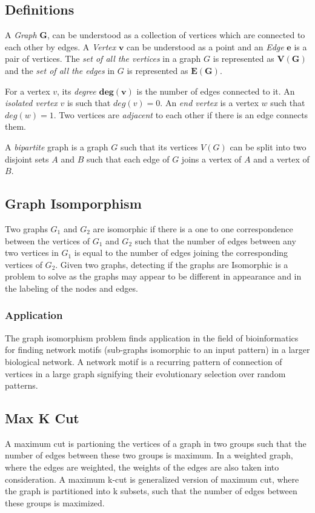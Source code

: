 \subsection{Definitions}
\label{graphtheory: definitions}
A \emph{Graph} $\boldsymbol{G}$, can be understood as a collection of vertices which are
connected to each other by edges.  A \emph{Vertex} $\boldsymbol{v}$ can be understood as a
point and an \emph{Edge} $\boldsymbol{e}$ is a pair of vertices.  The \emph{set of all the vertices}
in a graph $G$ is represented as $\boldsymbol{V(G)}$ and the \emph{set of all the
edges} in $G$ is represented as $\boldsymbol{E(G)}$.

For a vertex $v$, its \emph{degree} $\boldsymbol{deg(v)}$ is the number of edges
connected to it.  An \emph{isolated vertex} $v$ is such that $deg(v) = 0$. An
\emph{end vertex} is a vertex $w$ such that $deg(w) = 1$.  Two vertices are
\emph{adjacent} to each other if there is an edge connects them.

A \emph{bipartite} graph is a graph $G$ such that its vertices $V(G)$ can
be split into two disjoint sets $A$ and $B$ such that each edge of $G$ joins a
vertex of $A$ and a vertex of $B$. \cite{Newman10} 


\subsection{Graph Isomporphism}
Two graphs $G_1$ and $G_2$ are isomorphic if there is a one to one correspondence
between the vertices of $G_1$ and $G_2$ such that the number of edges between any
two vertices in $G_1$ is equal to the number of edges joining the corresponding
vertices of $G_2$.  Given two graphs, detecting if the graphs are Isomorphic is
a problem to solve as the graphs may appear to be different in appearance and
in the labeling of the nodes and edges. \cite{Newman10}

\subsubsection{Application}
The graph isomorphism problem finds application in the field of bioinformatics
for finding network motifs (sub-graphs isomorphic to an input pattern) in a
larger biological network. A network motif is a recurring pattern of connection
of vertices in a large graph signifying their evolutionary selection over
random patterns. \cite{Bonnici2013}

\subsection{Max K Cut}
A maximum cut is partioning the vertices of a graph in two groups such that
the number of edges between these two groups is maximum. In a weighted graph,
where the edges are weighted, the weights of the edges are also taken into
consideration.  A maximum k-cut is generalized version of maximum cut, where
the graph is partitioned into k subsets, such that the number of edges between
these groups is maximized.

